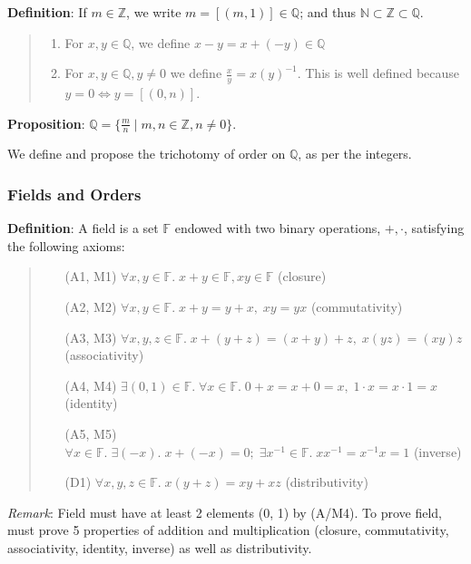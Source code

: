 \documentclass[11pt]{article}
\begin{document}
\textbf{Definition}: If $m \in \mathbb{Z}$, we write $m = [(m,1)] \in \mathbb{Q}$; and thus $\mathbb{N} \subset \mathbb{Z} \subset \mathbb{Q}$.
\begin{quote}\vspace{-0.3cm}
	\begin{enumerate}
	\item For $x,y \in \mathbb{Q}$, we define $x-y = x+(-y) \in \mathbb{Q}$
	\item For $x,y \in \mathbb{Q}, y \neq 0$ we define $\frac{x}{y} = x(y)^{-1}$. This is well defined because $y=0 \iff y = [(0,n)]$.\end{enumerate}
\end{quote}
\textbf{Proposition}: $\mathbb{Q} = \{\frac{m}{n} \;|\; m,n \in \mathbb{Z}, n \neq 0\}$.

We define and propose the trichotomy of order on $\mathbb{Q}$, as per the integers.

\subsubsection{Fields and Orders}

\textbf{Definition}: A field is a set $\mathbb{F}$ endowed with two binary operations, $+, \cdot$, satisfying the following axioms:
\begin{quote}\vspace{-0.3cm}
	\begin{enumerate}
	\item[(A1, M1)] $\forall x,y \in \mathbb{F}.\; x+y \in \mathbb{F}, xy \in \mathbb{F}$ (closure)
	\item[(A2, M2)] $\forall x,y \in \mathbb{F}.\; x + y = y + x,\; xy = yx$ (commutativity)
	\item[(A3, M3)] $\forall x,y,z \in \mathbb{F}.\; x + (y+z) = (x+y) + z,\; x(yz) = (xy)z$ (associativity)
	\item[(A4, M4)] $\exists (0,1) \in \mathbb{F}.\; \forall x \in \mathbb{F}.\; 0 + x = x + 0 = x,\; 1 \cdot x = x \cdot 1 = x$ (identity)
	\item[(A5, M5)] $\forall x \in \mathbb{F}.\; \exists (-x).\; x + (-x) = 0;\; \exists x^{-1} \in \mathbb{F}.\; xx^{-1} = x^{-1}x = 1$ (inverse)
	\item[(D1)] $\forall x,y,z \in \mathbb{F}.\; x(y+z) = xy + xz$ (distributivity)
	\end{enumerate}
\end{quote}

\emph{Remark}: Field must have at least 2 elements (0, 1) by (A/M4). To prove field, must prove 5 properties of addition and multiplication (closure, commutativity, associativity, identity, inverse) as well as distributivity.
\end{document}
